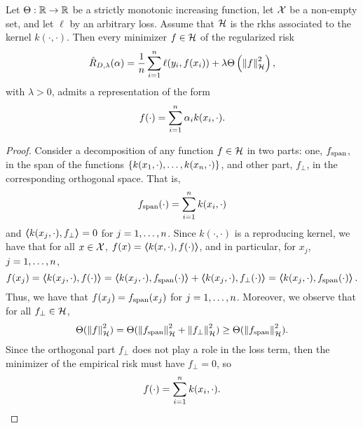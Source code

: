 \begin{theorem}\label{th:repr_theorem}
    Let $\Theta: \mathbb{R} \to \mathbb{R}$ be a strictly monotonic increasing function, let $\mathcal{X}$ be a non-empty set, and let $\ell$ by an arbitrary loss. Assume that $\mathcal{H}$ is the \acrshort{rkhs} associated to the kernel $k(\cdot, \cdot)$.
    Then every minimizer $f \in \mathcal{H}$ of the regularized risk 
    \begin{equation}
        \nonumber
        \hat{R}_{D, \lambda}(\alpha) = \frac{1}{n} \sum_{i=1}^n \ell(y_i, f(x_i)) + \lambda \Theta\left(\left\lVert f\right\rVert^2_{\mathcal{H}} \right) ,
    \end{equation}
    with $\lambda > 0$, admits a representation of the form
    \begin{equation}
        \label{eq:reprth_def}
        f(\cdot) = \sum_{i=1}^\nsamples \alpha_i k(x_i, \cdot) .
    \end{equation}
\end{theorem}
\begin{proof}
    Consider a decomposition of any function $f \in \mathcal{H}$ in two parts: one, $f_{\operatorname{span}}$, in the span of the functions $\left\{k(x_1, \cdot), \ldots, k(x_n, \cdot)\right\}$, and other part, $f_{\perp}$, in the corresponding orthogonal space. That is,
    \begin{equation}
        \nonumber
        f_{\operatorname{span}}(\cdot) = \sum_{i=1}^n k(x_i, \cdot)
    \end{equation}
    and $\bm{\left\langle} k(x_j, \cdot), f_{\perp} \bm{\right\rangle} = 0$ for $j=1, \ldots, n$.
%
    Since $k(\cdot, \cdot)$ is a reproducing kernel, we have that for all $x \in \mathcal{X}$, 
    $f(x) = \bm{\left\langle} k(x, \cdot), f(\cdot) \bm{\right\rangle}$, and in particular, for $x_j$, $j=1, \ldots, n$,
    \begin{equation}
        \nonumber
        f(x_j) = \bm{\left\langle} k(x_j, \cdot), f(\cdot) \bm{\right\rangle} = \bm{\left\langle} k(x_j, \cdot), f_{\operatorname{span}}(\cdot) \bm{\right\rangle} + \bm{\left\langle} k(x_j, \cdot), f_{\perp}(\cdot) \bm{\right\rangle} = \bm{\left\langle} k(x_j, \cdot), f_{\operatorname{span}}(\cdot) \bm{\right\rangle}.
    \end{equation}
    Thus, we have that $f(x_j) = f_{\operatorname{span}}(x_j)$ for $j=1, \ldots, n$.
    Moreover, we observe that for all $f_{\perp} \in \mathcal{H}$,
    \begin{equation}
        \nonumber
        \Theta(\left\lVert f\right\rVert_{\mathcal{H}}^2) = \Theta(\left\lVert f_{\operatorname{span}}\right\rVert_{\mathcal{H}}^2 + \left\lVert f_{\perp}\right\rVert_{\mathcal{H}}^2) \geq \Theta(\left\lVert f_{\operatorname{span}}\right\rVert_{\mathcal{H}}^2) .
    \end{equation}
    Since the orthogonal part $f_{\perp}$ does not play a role in the loss term, then the minimizer of the empirical risk must have $f_{\perp} = 0$, so 
    $$ f(\cdot) = \sum_{i=1}^n k(x_i, \cdot).$$
\end{proof}
